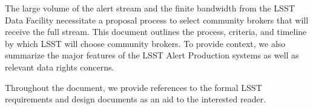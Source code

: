 The large volume of the alert stream and the finite bandwidth from the LSST Data Facility necessitate a proposal process to select community brokers that will receive the full stream.
This document outlines the process, criteria, and timeline by which LSST will choose community brokers.
To provide context, we also summarize the major features of the LSST Alert Production systems as well as relevant data rights concerns.

Throughout the document, we provide references to the formal LSST requirements and design documents as an aid to the interested reader.
